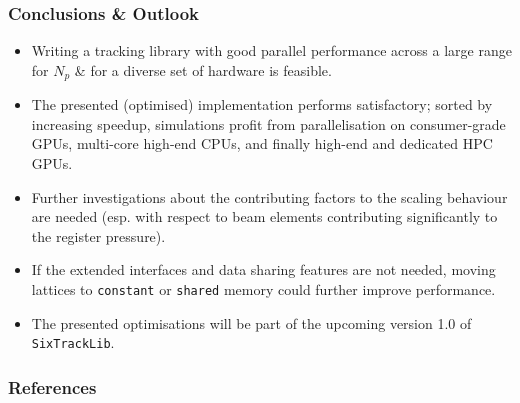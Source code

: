\documentclass{beamer}
\begin{document}
\begin{frame}
    \frametitle{Conclusions \& Outlook}
    \begin{itemize}
        \item Writing a tracking library with good parallel performance across a large range for $N_{p}$ \& for a diverse set of hardware is feasible.
        \item The presented (optimised) implementation performs satisfactory; sorted by increasing speedup, simulations profit from parallelisation on
        consumer-grade GPUs, multi-core high-end CPUs, and finally high-end and dedicated HPC GPUs.
        \item Further investigations about the contributing factors to the scaling behaviour are needed (esp. with respect to beam elements
              contributing significantly to the register pressure).
        \item If the extended interfaces and data sharing features are not needed, moving lattices to \texttt{constant} or \texttt{shared} memory could further improve performance.
        \item The presented optimisations will be part of the upcoming version 1.0 of \texttt{SixTrackLib}.
    \end{itemize}
\end{frame}


\begin{frame}[allowframebreaks, t]
    \frametitle{References}
    \tiny
    \printbibliography
\end{frame}
\end{document}

